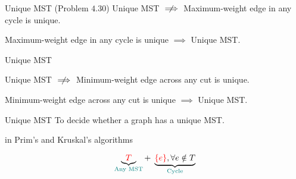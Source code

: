 \begin{frame}{}
  \begin{exampleblock}{Unique MST (Problem $4.30$)}
    Unique MST $\centernot\implies$ Maximum-weight edge in any cycle is unique.
  \end{exampleblock}

  \pause

  \pause
  \begin{theorem}
    \centerline{Maximum-weight edge in any cycle is unique $\implies$ Unique MST.}
  \end{theorem}

\end{frame}

\begin{frame}{}
  \begin{exampleblock}{Unique MST}
    \centerline{Unique MST $\centernot\implies$ Minimum-weight edge across any cut is unique.}
  \end{exampleblock}

  \pause

  \pause
  \begin{theorem}
    \centerline{Minimum-weight edge across any cut is unique $\implies$ Unique MST.}
  \end{theorem}
\end{frame}

% 

\begin{frame}{}
  \begin{exampleblock}{Unique MST}
    To decide whether a graph has a unique MST.
  \end{exampleblock}

  \pause
  \vspace{0.80cm}
  \centerline{\large {} in Prim's and Kruskal's algorithms}

  \pause

  \pause
  \vspace{-0.30cm}
  \[
    \underbrace{\textcolor{red}{T}}_{\textcolor{teal}{\text{Any MST}}} +\; \underbrace{\textcolor{red}{\left\{e\right\}}, \forall e \notin T}_{\textcolor{teal}{\text{Cycle}}}
  \]

  \pause
  \centerline{}
\end{frame}


